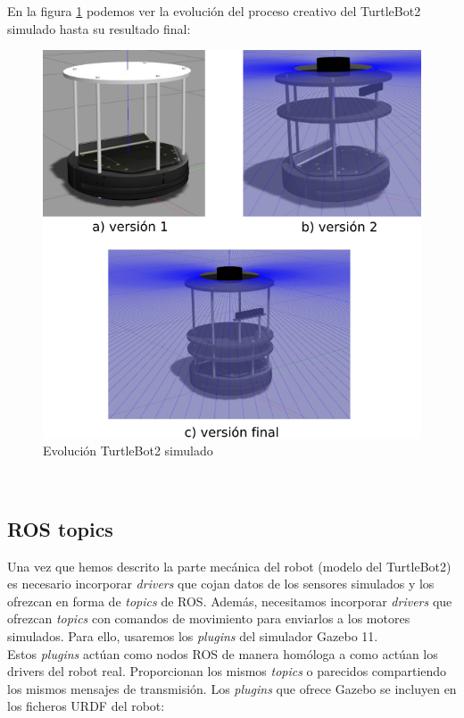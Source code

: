 En la figura \ref{fig:evolucion_turtlebot2_sim} podemos ver la evolución del proceso creativo del TurtleBot2 simulado hasta su resultado final:\\
\begin{figure} [H]
  \begin{center}
    \includegraphics[width=12.5cm]{imagenes/cap4/creacion-turtlebot2-sim.png}
  \end{center}
  \caption[Evolución TurtleBot2 simulado]{Evolución TurtleBot2 simulado}
  \label{fig:evolucion_turtlebot2_sim}
\end{figure}\


\subsection{ROS topics}
\label{subsec:ros_topics}

Una vez que hemos descrito la parte mecánica del robot (modelo del TurtleBot2) es necesario incorporar \textit{drivers} que cojan datos de los sensores simulados y los ofrezcan en forma de \textit{topics} de ROS. Además, necesitamos incorporar \textit{drivers} que ofrezcan \textit{topics} con comandos de movimiento para enviarlos a los motores simulados. Para ello, usaremos los \textit{plugins} del simulador Gazebo 11.\\

Estos \textit{plugins} actúan como nodos ROS de manera homóloga a como actúan los drivers del robot real. Proporcionan los mismos \textit{topics} o parecidos compartiendo los mismos mensajes de transmisión. Los \textit{plugins} que ofrece Gazebo se incluyen en los ficheros URDF del robot:\\

